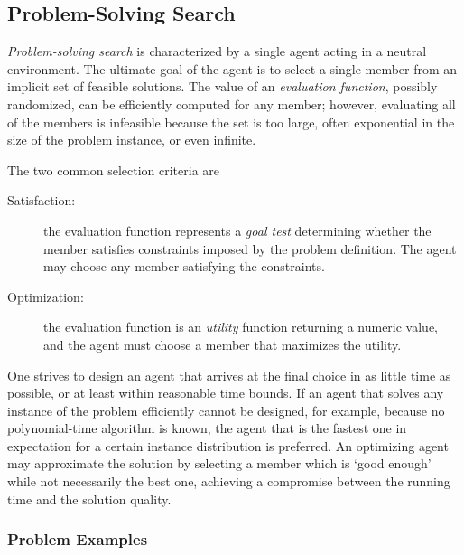 \subsection{Problem-Solving Search}

{\em Problem-solving search} is characterized by a single agent acting
in a neutral environment\cite{Russell.aima}. The ultimate goal of the
agent is to select a single member from an implicit set of feasible
solutions. The value of an {\em evaluation function}, possibly
randomized, can be efficiently computed for any member; however,
evaluating all of the members is infeasible because the set is too
large, often exponential in the size of the problem instance, or
even infinite.

The two common selection criteria are 
\begin{description}
  \item[Satisfaction:] the evaluation function represents a {\em goal
    test} determining whether the member satisfies constraints imposed
    by the problem definition. The agent may choose any member
    satisfying the constraints.

  \item[Optimization:] the evaluation function is an {\em utility} function
    returning a numeric value, and the agent must choose a member that
    maximizes the utility.
\end{description}

One strives to design an agent that arrives at the final choice in as
little time as possible, or at least within reasonable time bounds.
If an agent that solves any instance of the problem efficiently cannot
be designed, for example, because no polynomial-time algorithm is
known, the agent that is the fastest one in expectation for a certain
instance distribution is preferred.  An optimizing agent may
approximate the solution by selecting a member which is `good enough'
while not necessarily the best one, achieving a compromise between the
running time and the solution quality.

\subsubsection{Problem Examples}

